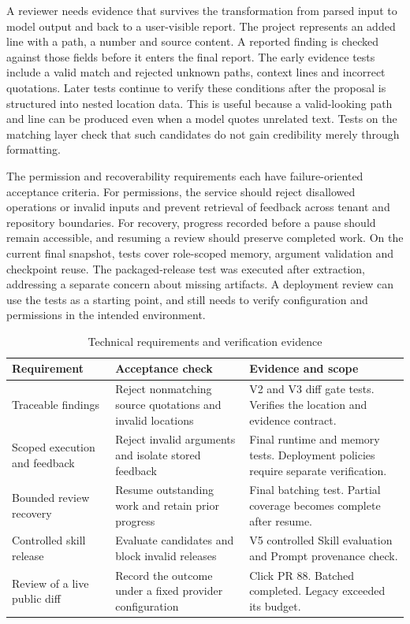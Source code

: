 \documentclass[journal,compsoc]{IEEEtran}
\begin{document}
A reviewer needs evidence that survives the transformation from parsed input to model output and back to a user-visible report. The project represents an added line with a path, a number and source content. A reported finding is checked against those fields before it enters the final report. The early evidence tests include a valid match and rejected unknown paths, context lines and incorrect quotations. Later tests continue to verify these conditions after the proposal is structured into nested location data. This is useful because a valid-looking path and line can be produced even when a model quotes unrelated text. Tests on the matching layer check that such candidates do not gain credibility merely through formatting.

The permission and recoverability requirements each have failure-oriented acceptance criteria. For permissions, the service should reject disallowed operations or invalid inputs and prevent retrieval of feedback across tenant and repository boundaries. For recovery, progress recorded before a pause should remain accessible, and resuming a review should preserve completed work. On the current final snapshot, tests cover role-scoped memory, argument validation and checkpoint reuse. The packaged-release test was executed after extraction, addressing a separate concern about missing artifacts. A deployment review can use the tests as a starting point, and still needs to verify configuration and permissions in the intended environment.

\begin{table}[t]
\caption{Technical requirements and verification evidence}
\centering
\begin{tabular}{p{}p{}p{}}
\toprule
Requirement & Acceptance check & Evidence and scope \\ \midrule
Traceable findings & Reject nonmatching source quotations and invalid locations & V2 and V3 diff gate tests. Verifies the location and evidence contract. \\
Scoped execution and feedback & Reject invalid arguments and isolate stored feedback & Final runtime and memory tests. Deployment policies require separate verification. \\
Bounded review recovery & Resume outstanding work and retain prior progress & Final batching test. Partial coverage becomes complete after resume. \\
Controlled skill release & Evaluate candidates and block invalid releases & V5 controlled Skill evaluation and Prompt provenance check. \\
Review of a live public diff & Record the outcome under a fixed provider configuration & Click PR 88. Batched completed. Legacy exceeded its budget. \\
\bottomrule
\end{tabular}
\end{table}
\end{document}
